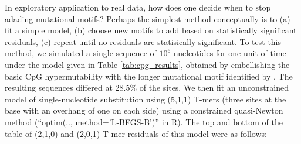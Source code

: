 \documentclass{article}
\newcommand{\nA}{\mbox{A}}  %
\newcommand{\nC}{\mbox{C}}
\newcommand{\nG}{\mbox{G}}
\newcommand{\nT}{\mbox{T}}
\theoremstyle{plain}
\theoremstyle{definition}
\begin{document}
In exploratory application to real data, how does one decide when to stop adading mutational motifs?
Perhaps the simplest method conceptually is to
(a) fit a simple model,
(b) choose new motifs to add based on statistically significant residuals,
(c) repeat until no residuals are statisically significant.
To test this method,
we simulated a single sequence of $10^6$ nucleotides
for one unit of time
under the model given in Table \ref{tab:cpg_results},
obtained by embellishing the basic CpG hypermutability
with the longer mutational motif identified by \citet{harris2015evidence}.
The resulting sequences differed at 28.5\% of the sites.
We then fit an unconstrained model of single-nucleotide substitution using (5,1,1) T-mers
(three sites at the base with an overhang of one on each side)
using a constrained quasi-Newton method (``optim(.., method='L-BFGS-B')'' in R).
The top and bottom of the table of (2,1,0) and (2,0,1) T-mer residuals of this model were as follows:
\end{document}
